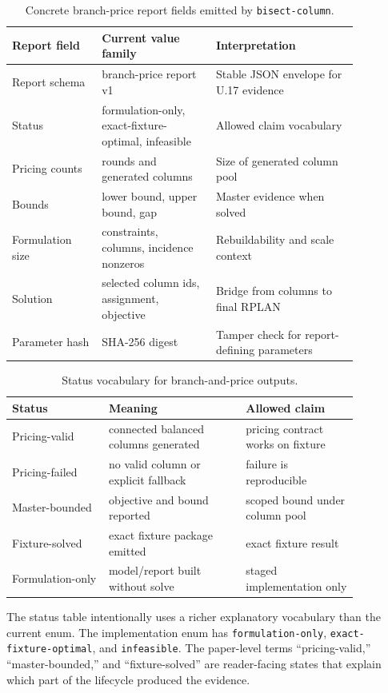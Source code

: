 \begin{table}[htbp]
\centering
\small
\begin{tabular}{p{0.22\linewidth}p{0.29\linewidth}p{0.35\linewidth}}
\toprule
Report field & Current value family & Interpretation \\
\midrule
Report schema & branch-price report v1 & Stable JSON envelope for U.17 evidence \\
Status & formulation-only, exact-fixture-optimal, infeasible & Allowed claim vocabulary \\
Pricing counts & rounds and generated columns & Size of generated column pool \\
Bounds & lower bound, upper bound, gap & Master evidence when solved \\
Formulation size & constraints, columns, incidence nonzeros & Rebuildability and scale context \\
Solution & selected column ids, assignment, objective & Bridge from columns to final RPLAN \\
Parameter hash & SHA-256 digest & Tamper check for report-defining parameters \\
\bottomrule
\end{tabular}
\caption{Concrete branch-price report fields emitted by \texttt{bisect-column}.}
\end{table}

\begin{table}[htbp]
\centering
\small
\begin{tabular}{p{0.24\linewidth}p{0.34\linewidth}p{0.28\linewidth}}
\toprule
Status & Meaning & Allowed claim \\
\midrule
Pricing-valid & connected balanced columns generated & pricing contract works on fixture \\
Pricing-failed & no valid column or explicit fallback & failure is reproducible \\
Master-bounded & objective and bound reported & scoped bound under column pool \\
Fixture-solved & exact fixture package emitted & exact fixture result \\
Formulation-only & model/report built without solve & staged implementation only \\
\bottomrule
\end{tabular}
\caption{Status vocabulary for branch-and-price outputs.}
\end{table}

The status table intentionally uses a richer explanatory vocabulary than the
current enum. The implementation enum has \texttt{formulation-only},
\texttt{exact-fixture-optimal}, and \texttt{infeasible}. The paper-level terms
``pricing-valid,'' ``master-bounded,'' and ``fixture-solved'' are reader-facing
states that explain which part of the lifecycle produced the evidence.
